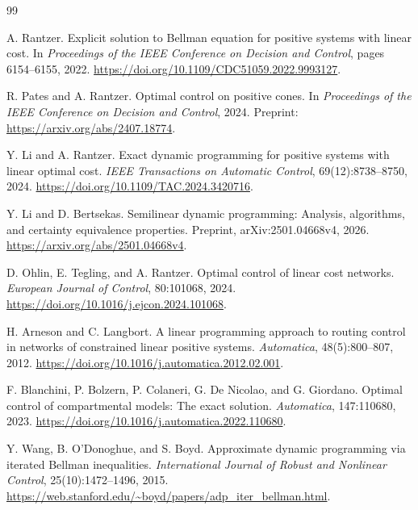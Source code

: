 \documentclass[10pt]{article}
\begin{document}
\begin{thebibliography}{99}

A. Rantzer.
\newblock Explicit solution to Bellman equation for positive systems with linear cost.
\newblock In \emph{Proceedings of the IEEE Conference on Decision and Control}, pages 6154--6155, 2022.
\newblock \url{https://doi.org/10.1109/CDC51059.2022.9993127}.

R. Pates and A. Rantzer.
\newblock Optimal control on positive cones.
\newblock In \emph{Proceedings of the IEEE Conference on Decision and Control}, 2024.
\newblock Preprint: \url{https://arxiv.org/abs/2407.18774}.

Y. Li and A. Rantzer.
\newblock Exact dynamic programming for positive systems with linear optimal cost.
\newblock \emph{IEEE Transactions on Automatic Control}, 69(12):8738--8750, 2024.
\newblock \url{https://doi.org/10.1109/TAC.2024.3420716}.

Y. Li and D. Bertsekas.
\newblock Semilinear dynamic programming: Analysis, algorithms, and certainty equivalence properties.
\newblock Preprint, arXiv:2501.04668v4, 2026.
\newblock \url{https://arxiv.org/abs/2501.04668v4}.

D. Ohlin, E. Tegling, and A. Rantzer.
\newblock Optimal control of linear cost networks.
\newblock \emph{European Journal of Control}, 80:101068, 2024.
\newblock \url{https://doi.org/10.1016/j.ejcon.2024.101068}.

H. Arneson and C. Langbort.
\newblock A linear programming approach to routing control in networks of constrained linear positive systems.
\newblock \emph{Automatica}, 48(5):800--807, 2012.
\newblock \url{https://doi.org/10.1016/j.automatica.2012.02.001}.

F. Blanchini, P. Bolzern, P. Colaneri, G. De Nicolao, and G. Giordano.
\newblock Optimal control of compartmental models: The exact solution.
\newblock \emph{Automatica}, 147:110680, 2023.
\newblock \url{https://doi.org/10.1016/j.automatica.2022.110680}.

Y. Wang, B. O'Donoghue, and S. Boyd.
\newblock Approximate dynamic programming via iterated Bellman inequalities.
\newblock \emph{International Journal of Robust and Nonlinear Control}, 25(10):1472--1496, 2015.
\newblock \url{https://web.stanford.edu/~boyd/papers/adp_iter_bellman.html}.


\end{thebibliography}
\end{document}
